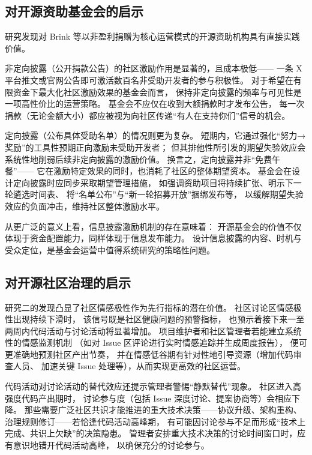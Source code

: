 \subsection{对开源资助基金会的启示}

研究发现对 Brink 等以非盈利捐赠为核心运营模式的开源资助机构具有直接实践价值。

非定向披露（公开捐款公告）的社区激励作用是显著的，且成本极低——
一条 X 平台推文或官网公告即可激活数百名非受助开发者的参与积极性。
对于希望在有限资金下最大化社区激励效果的基金会而言，
保持非定向披露的频率与可见性是一项高性价比的运营策略。
基金会不应仅在收到大额捐款时才发布公告，
每一次捐款（无论金额大小）都应被视为向社区传递“有人在支持你们”信号的机会。

定向披露（公布具体受助名单）的情况则更为复杂。
短期内，它通过强化“努力→奖励”的工具性预期正向激励未受助开发者；
但其排他性所引发的期望失验效应会系统性地削弱后续非定向披露的激励价值。
换言之，定向披露并非“免费午餐”——
它在激励特定效果的同时，也消耗了社区的整体期望资本。
基金会在设计定向披露时应同步采取期望管理措施，
如强调资助项目将持续扩张、明示下一轮遴选时间表、
将“名单公布”与“新一轮招募开放”捆绑发布等，
以缓解期望失验效应的负面冲击，维持社区整体激励水平。

从更广泛的意义上看，信息披露激励机制的存在意味着：
开源基金会的价值不仅体现于资金配置能力，同样体现于信息发布能力。
设计信息披露的内容、时机与受众定位，是基金会运营中值得系统研究的策略性问题。

\subsection{对开源社区治理的启示}

研究二的发现凸显了社区情感极性作为先行指标的潜在价值。
社区讨论区情感极性出现持续下滑时，
该信号既是社区健康问题的预警指标，
也预示着接下来一至两周内代码活动与讨论活动将显著增加。
项目维护者和社区管理者若能建立系统性的情感监测机制
（如对 Issue 区评论进行实时情感追踪并生成周度报告），
便可更准确地预测社区产出节奏，
并在情感低谷期有针对性地引导资源（增加代码审查人员、
加速关键 Issue 处理等），从而实现更高效的社区运营。

代码活动对讨论活动的替代效应还提示管理者警惕“静默替代”现象。
社区进入高强度代码产出期时，
讨论参与度（包括 Issue 深度讨论、提案协商等）会相应下降。
那些需要广泛社区共识才能推进的重大技术决策——协议升级、架构重构、
治理规则修订——若恰逢代码活动高峰期，
有可能因讨论参与不足而形成“技术上完成、共识上欠缺”的决策隐患。
管理者安排重大技术决策的讨论时间窗口时，应有意识地错开代码活动高峰，
以确保充分的讨论参与。

